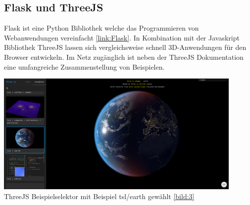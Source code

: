 \subsection{Flask und ThreeJS}
Flask ist eine Python Bibliothek welche das Programmieren von Webanwendungen vereinfacht \ref{link:Flask}. In Kombination mit der Javaskript Bibliothek ThreeJS lassen sich vergleichsweise schnell 3D-Anwendungen für den Browser entwickeln. Im Netz zugänglich ist neben der ThreeJS Dokumentation eine umfangreiche Zusammenstellung von Beispielen.
\begin{center}
	\includegraphics[width=0.9\textwidth, keepaspectratio]{../images/0062 ThreeJS Beispielselektor.png}{\\ThreeJS Beispielselektor mit Beispiel tsl/earth gewählt \ref{bild:3}}
\end{center}